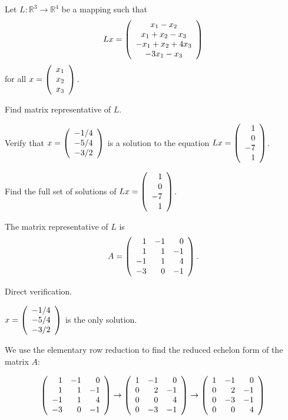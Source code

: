 \documentclass{ximera}
\begin{document}
\begin{exercise} \label{YZ_3.4.6}
Let $L:\mathbb R^3\to \mathbb R^4$ be a mapping such that 
\[
Lx=\left(\begin{array}{cccccccccccc} x_1-x_2 \\ x_1+x_2-x_3\\ -x_1+x_2+4x_3 \\ -3x_1-x_3 \end{array}\right)
\]
for all $x=\left(\begin{array}{rrrrrrrrrrrrrrrrrr} x_1 \\ x_2 \\ x_3 \end{array}\right).$
\begin{enumeratea}
\item Find matrix representative of $L$.
\item Verify that $x=\left(\begin{array}{rrrrrrrrrrrrrrrrrr} -1/4\\-5/4\\-3/2 \end{array}\right)$ is a solution to the equation $Lx=\left(\begin{array}{rrrrrrrrrrrrrrrrrr} 1 \\ 0 \\ -7\\1  \end{array}\right)$.
\item Find the full set of solutions of $Lx=\left(\begin{array}{rrrrrrrrrrrrrrrrrr} 1 \\ 0 \\ -7\\1  \end{array}\right)$.
\end{enumeratea}


\begin{solution}

\ans
 \begin{enumeratea}
\item  The matrix representative of $L$ is 
\[
A=\left(\begin{array}{rrrrrrrrrrrrrrrrrr} 1 &-1& 0\\ 1&1&-1\\ -1&1&4 \\ -3&0&-1 \end{array}\right).
\]
\item Direct verification.
\item $x=\left(\begin{array}{rrrrrrrrrrrrrrrrrr} -1/4\\-5/4\\-3/2 \end{array}\right)$ is the only solution.
\end{enumeratea}


\soln {}

We use the elementary row reduction to find the reduced echelon form of the matrix $A$:

\[
\left(\begin{array}{rrrrrrrrrrrrrrrrrr} 1 &-1& 0 \\ 1&1&-1 \\ -1&1&4  \\ -3&0&-1  \end{array}\right) \to \left(\begin{array}{rrrrrrrrrrrrrrrrrr} 1 &-1& 0 \\ 0&2&-1 \\ 0&0&4 \\ 0&-3&-1 \end{array}\right) \to
\left(\begin{array}{rrrrrrrrrrrrrrrrrr}  1 &-1& 0\\ 0&2&-1 \\ 0&-3&-1 \\ 0&0&4   \end{array}\right)
\]


\end{solution}
\end{exercise}
\end{document}
